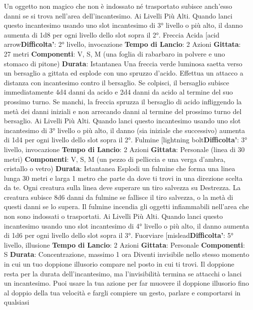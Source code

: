\begin{multicols}{2}
Un oggetto non magico che non è indossato né
trasportato subisce anch’esso danni se si trova
nell’area dell’incantesimo.
Ai Livelli Più Alti. Quando lanci questo incantesimo
usando uno slot incantesimo di 3° livello o più alto, il
danno aumenta di 1d8 per ogni livello dello slot sopra il
2°.
Freccia Acida
[acid arrow\textbf{Difficolta'}:
2° livello, invocazione
\textbf{Tempo di Lancio}: 2 Azioni
\textbf{Gittata}: 27 metri
\textbf{Componenti}: V, S, M (una foglia di rabarbaro in
polvere e uno stomaco di pitone)
\textbf{Durata}: Istantanea
Una freccia verde luminosa saetta verso un bersaglio a
gittata ed esplode con uno spruzzo d’acido. Effettua un
attacco a distanza con incantesimo contro il bersaglio.
Se colpisci, il bersaglio subisce immediatamente 4d4
danni da acido e 2d4 danni da acido al termine del suo
prossimo turno. Se manchi, la freccia spruzza il
bersaglio di acido infliggendo la metà dei danni iniziali e
non arrecando danni al termine del prossimo turno del
bersaglio.
Ai Livelli Più Alti. Quando lanci questo incantesimo
usando uno slot incantesimo di 3° livello o più alto, il
danno (sia iniziale che successivo) aumenta di 1d4 per
ogni livello dello slot sopra il 2°.
Fulmine
[lightning bolt\textbf{Difficolta'}:
3° livello, invocazione
\textbf{Tempo di Lancio}: 2 Azioni
\textbf{Gittata}: Personale (linea di 30 metri)
\textbf{Componenti}: V, S, M (un pezzo di pelliccia e una
verga d’ambra, cristallo o vetro)
\textbf{Durata}: Istantanea
Esplodi un fulmine che forma una linea lunga 30 metri e
larga 1 metro che parte da dove ti trovi in una
direzione scelta da te.
Ogni creatura sulla linea deve superare un tiro salvezza
su Destrezza. La creatura subisce 8d6 danni da fulmine
se fallisce il tiro salvezza, o la metà di questi danni se lo
supera.
Il fulmine incendia gli oggetti infiammabili nell’area che
non sono indossati o trasportati.
Ai Livelli Più Alti. Quando lanci questo incantesimo
usando uno slot incantesimo di 4° livello o più alto, il
danno aumenta di 1d6 per ogni livello dello slot sopra il
3°.
Fuorviare
[mislead\textbf{Difficolta'}:
5° livello, illusione
\textbf{Tempo di Lancio}: 2 Azioni
\textbf{Gittata}: Personale
\textbf{Componenti}: S
\textbf{Durata}: Concentrazione, massimo 1 ora
Diventi invisibile nello stesso momento in cui un tuo
doppione illusorio compare nel posto in cui ti trovi. Il
doppione resta per la durata dell’incantesimo, ma
l’invisibilità termina se attacchi o lanci un incantesimo.
Puoi usare la tua azione per far muovere il doppione
illusorio fino al doppio della tua velocità e fargli
compiere un gesto, parlare e comportarsi in qualsiasi

\end{multicols}
